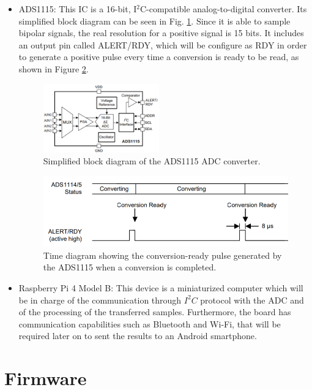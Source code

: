 \documentclass[twoside, twocolumn, spanish] {article}
\begin{document}
\begin{itemize}
\item ADS1115: This IC is a 16-bit, I$^2$C-compatible analog-to-digital converter. Its simplified block diagram can be seen in Fig. \ref{ads}. Since it is able to sample bipolar signals, the real resolution for a positive signal is 15 bits. It includes an output pin called ALERT/RDY, which will be configure as RDY in order to generate a positive pulse every time a conversion is ready to be read, as shown in Figure \ref{conversion_ready}.

\begin{figure}[h]
\centering
\includegraphics[width=5cm]{imag/ads}
\caption{Simplified block diagram of the ADS1115 ADC converter.}  \label{ads}
\end{figure}

\begin{figure}[h]
\centering
\includegraphics[width=\columnwidth]{imag/conversion_ready_cut}
\caption{Time diagram showing the conversion-ready pulse generated by the ADS1115 when a conversion is completed.}  \label{conversion_ready}
\end{figure}

\item Raspberry Pi 4 Model B: This device is a miniaturized computer which will be in charge of the communication through $I^2C$ protocol with the ADC and of the processing of the transferred samples. Furthermore, the board has communication capabilities such as Bluetooth and Wi-Fi, that will be required later on to sent the results to an Android smartphone.

\end{itemize}  

\section{Firmware}
\end{document}
